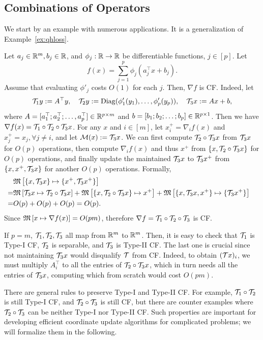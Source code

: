 \subsection{Combinations of Operators}\label{sc:comb}
We start by an example with numerous applications. It is a generalization of Example~\ref{ex:qhloss}.
\begin{example}\label{exp:log-grad} Let $a_j\in \mathbb{R}^m, b_j\in \mathbb{R}$, and $\phi_j:\mathbb{R}\to \mathbb{R}$ be differentiable functions, $j \in [p]$. Let $$f(x)=\sum_{j=1}^p \phi_j(a_j^\top x +b_j).$$ Assume that evaluating $\phi'_j$ costs $O(1)$ for each $j$. Then, $\nabla f$ is CF. Indeed, let $${\mathcal{T}}_1 y:=A^\top y,\quad {\mathcal{T}}_2 y := {\mathrm{Diag}}(\phi_1'(y_1),\ldots,\phi_p'(y_p)), \quad {\mathcal{T}}_3 x := Ax+b,$$ 
where $A=[a_1^\top; a_2^\top; \ldots,a_p^\top]\in \mathbb{R}^{p\times m}$ and $b=[b_1;b_2;\ldots;b_p]\in\mathbb{R}^{p\times 1}$. Then we have $\nabla f(x)= {\mathcal{T}}_1\circ{\mathcal{T}}_2\circ{\mathcal{T}}_3 x$. For any $x$ and $i\in[m]$, let $x^+_i=\nabla_i f(x)$ and $x^+_j=x_j,\forall j\neq i$, and let ${\mathcal{M}}(x):={\mathcal{T}}_3 x$. We can first compute ${\mathcal{T}}_2\circ{\mathcal{T}}_3 x$ from ${\mathcal{T}}_3 x$ for $O(p)$ operations, then compute $\nabla_i f(x)$ and thus $x^+$ from $\{x, {\mathcal{T}}_2\circ{\mathcal{T}}_3 x\}$ for  $O(p)$ operations, and finally update the maintained ${\mathcal{T}}_3 x$ to ${\mathcal{T}}_3 x^+$ from $\{x, x^+,{\mathcal{T}}_3 x\}$ for another $O(p)$ operations. Formally,
\begin{align*}
&\nops{\{x,\cT_3 x\}}{\{x^+, \cT_3x^+\}}\cr
=& \nops{\cT_3x}{\cT_2\circ\cT_3 x}+\nops {\{x,\cT_2\circ\cT_3 x\}}{x^+}+\nops{\{x,\cT_3 x, x^+\}}{\{\cT_3x^+\}}\cr
=& O(p) + O(p) +O(p)=O(p).\nonumber
\end{align*}
Since $\mathfrak{M}\left[{x}\mapsto {\nabla f(x)}\right]=O(pm)$, therefore
$\nabla f= {\mathcal{T}}_1\circ{\mathcal{T}}_2\circ{\mathcal{T}}_3$ is CF. 

If $p=m$, ${\mathcal{T}}_1,{\mathcal{T}}_2,{\mathcal{T}}_3$ all map from $\mathbb{R}^m$ to $\mathbb{R}^m$. Then, it is easy to check that ${\mathcal{T}}_1$ is Type-I CF, ${\mathcal{T}}_2$ is separable, and ${\mathcal{T}}_3$ is Type-II CF. The last one is crucial since not maintaining ${\mathcal{T}}_3 x$ would disqualify ${\mathcal{T}}$ from CF. Indeed, to obtain $({\mathcal{T}} x)_i$, we must multiply $A_i^\top$ to all the entries of ${\mathcal{T}}_2\circ{\mathcal{T}}_3 x$, which in turn needs all the entries of ${\mathcal{T}}_3 x$, computing which from scratch would cost $O(pm)$.

There are general rules to preserve Type-I and Type-II CF. For example, ${\mathcal{T}}_1\circ {\mathcal{T}}_2$ is still Type-I CF, and ${\mathcal{T}}_2\circ{\mathcal{T}}_3$ is still CF, but there are counter examples where  ${\mathcal{T}}_2\circ{\mathcal{T}}_3$  can be neither Type-I nor Type-II CF. Such properties are important for developing efficient coordinate update algorithms for complicated problems; we will formalize them in the following.
\end{example}

